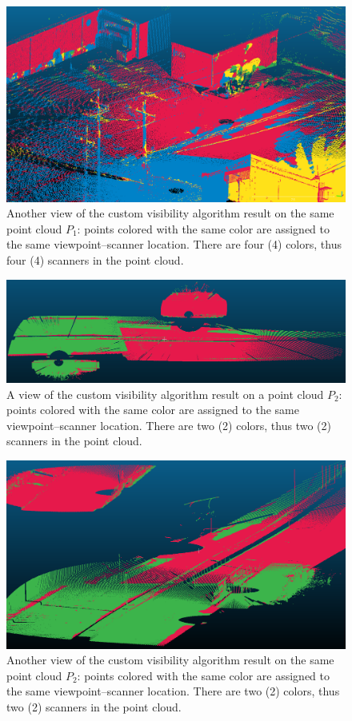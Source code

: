 \begin{figure}
  \centering
  \includegraphics[scale=0.35]{img/custom-result2.png}
  \caption{Another view of the custom visibility algorithm result on the same point cloud $P_1$: points colored with the same color are assigned to the same viewpoint--scanner location. There are four (4) colors, thus four (4) scanners in the point cloud.}
  \label{fig:custom-result2}
\end{figure}
\begin{figure}
  \centering
  \includegraphics[scale=0.35]{img/custom-result3.png}
  \caption{A view of the custom visibility algorithm result on a point cloud $P_2$: points colored with the same color are assigned to the same viewpoint--scanner location. There are two (2) colors, thus two (2) scanners in the point cloud.}
  \label{fig:custom-result3}
\end{figure}
\begin{figure}
  \centering
  \includegraphics[scale=0.35]{img/custom-result4.png}
  \caption{Another view of the custom visibility algorithm result on the same point cloud $P_2$: points colored with the same color are assigned to the same viewpoint--scanner location. There are two (2) colors, thus two (2) scanners in the point cloud.}
  \label{fig:custom-result4}
\end{figure}
